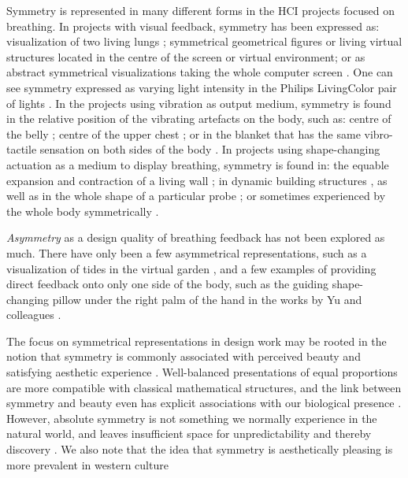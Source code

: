 Symmetry is represented in many different forms in the HCI projects focused on breathing. In  projects with visual feedback, symmetry has been expressed as: visualization of two living lungs \cite{abushakra_augmenting_2014}; symmetrical  geometrical figures \cite{van_rooij_deep_2016, prpa_hacking_2016} or living virtual structures \cite{patibanda_life_2017} located in the centre of the screen or virtual environment; or as abstract symmetrical visualizations taking the whole computer screen \cite{moraveji_breathtray_2012}. One can see symmetry expressed as varying light intensity in the Philips LivingColor pair of lights \cite{dijk_breathe_2011}. In the projects using vibration as output medium, symmetry is found in the relative position of the vibrating artefacts on the body, such as: centre of the belly \cite{bumatay_investigating_2017}; centre of the upper chest \cite{frey_breeze_2018}; or in the blanket that has the same vibro-tactile sensation on both sides of the body \cite{dijk_breathe_2011}. In projects using shape-changing actuation as a medium to display breathing, symmetry is found in: the equable expansion and contraction of a living wall \cite{sjoman_breathing_2018}; in dynamic building structures \cite{moran_exopranayama:_2016, schnadelbach_exobuilding:_2012}, as well as in the whole shape of a particular probe \cite{aslan_hold_2016, kim_breathingframe_2015}; or sometimes experienced by the whole body symmetrically \cite{sun_breath_2017}.

 \textit{Asymmetry} as a design quality of breathing feedback has not been explored as much. There have only been a few asymmetrical representations, such as a visualization of tides in the virtual garden \cite{roo_inner_2017}, and a few examples of providing direct feedback onto only one side of the body, such as the guiding shape-changing pillow under the right palm of the hand in the works by Yu and colleagues \cite{yu_breathe_2015}.

The focus on symmetrical representations in design work may be rooted in the notion that symmetry is commonly associated with perceived beauty and satisfying aesthetic experience \cite{nadal_study_2020, mcmanus_symmetry_2005}. Well-balanced presentations of equal proportions are more compatible with classical mathematical structures, and the link between symmetry and beauty even has explicit associations with our biological presence \cite{cardenas_symmetrical_2006}. However, absolute symmetry is not something we normally experience in the natural world, and leaves insufficient space for unpredictability and thereby discovery \cite{mcmanus_symmetry_2005}. We also note that the idea that symmetry is aesthetically pleasing is more prevalent in western culture \cite{nadal_study_2020, zeki_clive_2013}


